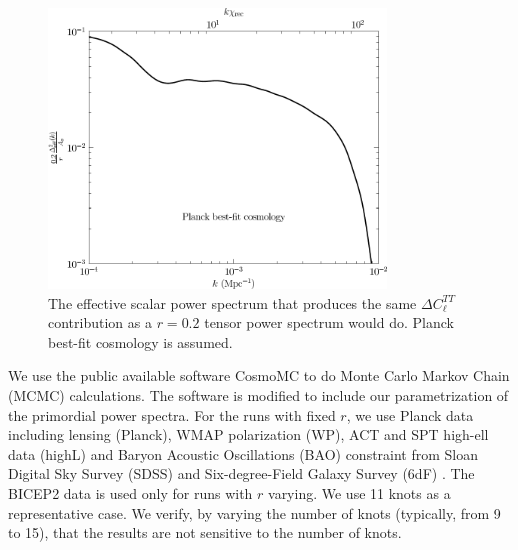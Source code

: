 \documentclass[a4paper,11pt]{article}
\def \figwidth{0.8\textwidth}
\begin{document}
\begin{figure}
  \centering
  \includegraphics[width = \figwidth]{ten_eff_ps.pdf}
  \caption{The effective scalar power spectrum that produces the same $\Delta C_\ell^{TT}$ contribution as a $r=0.2$ tensor power spectrum would do. Planck best-fit cosmology is assumed. \label{fig:effps}}
\end{figure}


We use the public available software CosmoMC \cite{CosmoMC} to do Monte Carlo Markov Chain (MCMC) calculations. The software is modified to include our parametrization of the primordial power spectra. For the runs with fixed $r$, we use Planck data including lensing (Planck), WMAP polarization (WP), ACT and SPT high-ell data (highL) and Baryon Acoustic Oscillations (BAO) constraint from Sloan Digital Sky Survey (SDSS) \cite{SDSSDR9} and Six-degree-Field Galaxy Survey (6dF) \cite{Jones2004, Jones2009}. The BICEP2 data is used only for runs with $r$ varying. We use 11 knots as a representative case. We verify, by varying the number of knots (typically, from 9 to 15), that the results are not sensitive to the number of knots.
\end{document}

